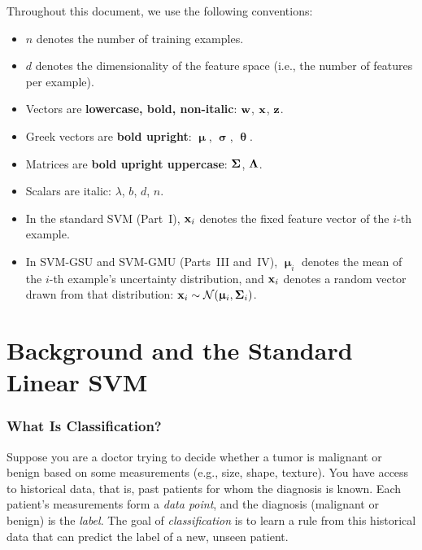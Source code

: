 \documentclass[11pt, letterpaper]{article}
\newcommand{\bSigma}{\vb{\Sigma}}
\newcommand{\bsigma}{\boldsymbol{\upsigma}}
\newcommand{\bmu}{\boldsymbol{\upmu}}
\newcommand{\bLambda}{\vb{\Lambda}}
\newcommand{\btheta}{\boldsymbol{\uptheta}}
\newcommand{\Norm}{\mathcal{N}}
\begin{document}
Throughout this document, we use the following conventions:
\begin{itemize}[leftmargin=2em]
    \item $n$ denotes the number of training examples.
    \item $d$ denotes the dimensionality of the feature space (i.e., the number of features per example).
    \item Vectors are \textbf{lowercase, bold, non-italic}: $\vb{w}$, $\vb{x}$, $\vb{z}$.
    \item Greek vectors are \textbf{bold upright}: $\bmu$, $\bsigma$, $\btheta$.
    \item Matrices are \textbf{bold upright uppercase}: $\bSigma$, $\bLambda$.
    \item Scalars are italic: $\lambda$, $b$, $d$, $n$.
    \item In the standard SVM (Part~I), $\vb{x}_i$ denotes the fixed feature vector of the $i$-th example.
    \item In SVM-GSU and SVM-GMU (Parts~III and~IV), $\bmu_i$ denotes the mean of the $i$-th example's uncertainty distribution, and $\vb{x}_i$ denotes a random vector drawn from that distribution: $\vb{x}_i \sim \Norm(\bmu_i, \bSigma_i)$.
\end{itemize}

\newpage

\part{Background and the Standard Linear SVM}

\section{What Is Classification?}

Suppose you are a doctor trying to decide whether a tumor is malignant or benign based on some measurements (e.g., size, shape, texture). You have access to historical data, that is, past patients for whom the diagnosis is known. Each patient's measurements form a \emph{data point}, and the diagnosis (malignant or benign) is the \emph{label}. The goal of \emph{classification} is to learn a rule from this historical data that can predict the label of a new, unseen patient.
\end{document}
